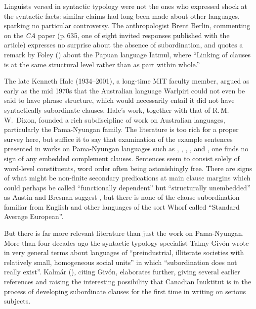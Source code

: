 \documentclass[output=paper,colorlinks,citecolor=brown
]{langscibook}
\begin{document}
\label{page-non-infinite-languages-start}Linguists versed in syntactic typology were not the ones who expressed
shock at the syntactic facts: similar claims had long been made about
other languages, sparking no particular controversy. The anthropologist
Brent Berlin, commenting on the \textit{CA} paper (p.\,635, one of
eight invited responses published with the article) expresses no
surprise about the absence of subordination, and quotes a remark by
Foley (\citeyear[177]{Foley86}) about the Papuan language Iatmul, where
``Linking of clauses is at the same structural level rather than as
part within whole.''

The late Kenneth Hale (1934--2001), a long-time MIT faculty member,
argued as early as the mid 1970s that the Australian language Warlpiri
could not even be said to have phrase structure, which would necessarily
entail it did not have syntactically subordinate clauses. Hale's work,
together with that of R.\,M.\,W.\ Dixon, founded a rich subdiscipline
of work on Australian languages, particularly the Pama-Nyungan family.
The literature is too rich for a proper survey here, but suffice it to
say that examination of the example sentences presented in works on
Pama-Nyungan languages such as \citet{Hale76}, \citet{Nash80},
\citet{Dixon81}, \citet{AustBres96}, and \citet{Pensalfini04},
one finds no sign of any embedded complement clauses. Sentences
seem to consist solely of word-level constituents, word order often
being astonishingly free. There are signs of what might be non-finite
secondary predications at main clause margins which could perhaps be
called ``functionally dependent'' but ``structurally unembedded'' as
Austin and Bresnan suggest \citeyearpar[228, esp.\ n.\,13]{AustBres96},
but there is none of the clause subordination familiar from English
and other languages of the sort Whorf called ``Standard Average European''.

But there is far more relevant literature than just the work on
Pama-Nyungan. More than four decades ago the syntactic typology
specialist Talmy Giv{\'o}n \citeyearpar[298]{Givon79} wrote in very
general terms about languages of ``preindustrial, illiterate societies
with relatively small, homogeneous social units'' in which
``subordination does not really exist''. Kalm{\'a}r (\citeyear[esp.\ pp.\,157--159]{Kalmar85}), citing Giv{\'o}n, elaborates further, giving
several earlier references and raising the interesting possibility
that Canadian Inuktitut is in the process of developing subordinate
clauses for the first time in writing on serious subjects.
\end{document}
